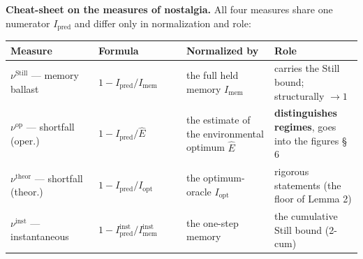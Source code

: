 \documentclass[pdflatex,sn-mathphys-ay]{sn-jnl}
\begin{document}
\textbf{Cheat-sheet on the measures of nostalgia.} All four measures share one numerator \(I_{\text{pred}}\) and differ only in normalization and role:



\begin{center}\small
\begin{tabular}{@{} >{\raggedright\arraybackslash}p{0.2500\linewidth} >{\raggedright\arraybackslash}p{0.2500\linewidth} >{\raggedright\arraybackslash}p{0.2500\linewidth} >{\raggedright\arraybackslash}p{0.2500\linewidth}@{}}
\toprule

\begin{minipage}[b]{\linewidth}\raggedright

Measure

\end{minipage} & \begin{minipage}[b]{\linewidth}\raggedright

Formula

\end{minipage} & \begin{minipage}[b]{\linewidth}\raggedright

Normalized by

\end{minipage} & \begin{minipage}[b]{\linewidth}\raggedright

Role

\end{minipage} \\

\midrule

\(\nu^{\text{Still}}\) --- memory ballast & \(1 - I_{\text{pred}}/I_{\text{mem}}\) & the full held memory \(I_{\text{mem}}\) & carries the Still bound; structurally \(\to 1\) \\

\(\nu^{\text{op}}\) --- shortfall (oper.) & \(1 - I_{\text{pred}}/\hat E\) & the estimate of the environmental optimum \(\hat E\) & \textbf{distinguishes regimes}, goes into the figures § 6 \\

\(\nu^{\text{theor}}\) --- shortfall (theor.) & \(1 - I_{\text{pred}}/I_{\text{opt}}\) & the optimum-oracle \(I_{\text{opt}}\) & rigorous statements (the floor of Lemma 2) \\

\(\nu^{\text{inst}}\) --- instantaneous & \(1 - I_{\text{pred}}^{\text{inst}}/I_{\text{mem}}^{\text{inst}}\) & the one-step memory & the cumulative Still bound (2-cum) \\

\bottomrule
\end{tabular}
\end{center}
\end{document}

